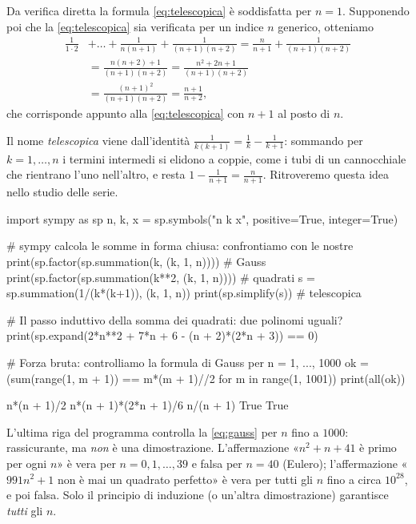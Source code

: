 \begin{dimostrazione}
Da verifica diretta la formula \eqref{eq:telescopica} è soddisfatta per $n=1$.
Supponendo poi che la \eqref{eq:telescopica} sia verificata per un indice $n$ generico,
otteniamo
\begin{equation}\label{eq:telescopica-passo}
\begin{split}
  \frac{1}{1\cdot2}&+\dots+\frac{1}{n(n+1)}+\frac{1}{(n+1)(n+2)}
  =\frac{n}{n+1}+\frac{1}{(n+1)(n+2)}\\
  &=\frac{n(n+2)+1}{(n+1)(n+2)}=\frac{n^{2}+2n+1}{(n+1)(n+2)}\\
  &=\frac{(n+1)^{2}}{(n+1)(n+2)}=\frac{n+1}{n+2},
\end{split}
\end{equation}
che corrisponde appunto alla \eqref{eq:telescopica} con $n+1$ al posto di $n$.
\end{dimostrazione}

\begin{osservazione}
Il nome \emph{telescopica} viene dall'identità $\frac{1}{k(k+1)}=\frac1k-\frac{1}{k+1}$:
sommando per $k=1,\dots,n$ i termini intermedi si elidono a coppie, come i tubi di un
cannocchiale che rientrano l'uno nell'altro, e resta $1-\frac{1}{n+1}=\frac{n}{n+1}$.
Ritroveremo questa idea nello studio delle serie.
\end{osservazione}

\begin{python}
import sympy as sp
n, k, x = sp.symbols("n k x", positive=True, integer=True)

# sympy calcola le somme in forma chiusa: confrontiamo con le nostre
print(sp.factor(sp.summation(k, (k, 1, n))))          # Gauss
print(sp.factor(sp.summation(k**2, (k, 1, n))))       # quadrati
s = sp.summation(1/(k*(k+1)), (k, 1, n))
print(sp.simplify(s))                                 # telescopica

# Il passo induttivo della somma dei quadrati: due polinomi uguali?
print(sp.expand(2*n**2 + 7*n + 6 - (n + 2)*(2*n + 3)) == 0)

# Forza bruta: controlliamo la formula di Gauss per n = 1, ..., 1000
ok = (sum(range(1, m + 1)) == m*(m + 1)//2 for m in range(1, 1001))
print(all(ok))
\end{python}
\begin{risultato}
n*(n + 1)/2
n*(n + 1)*(2*n + 1)/6
n/(n + 1)
True
True
\end{risultato}

\begin{attenzione}
L'ultima riga del programma controlla la \eqref{eq:gauss} per $n$ fino a $1000$:
rassicurante, ma \emph{non} è una dimostrazione. L'affermazione «$n^{2}+n+41$ è primo
per ogni $n$» è vera per $n=0,1,\dots,39$ e falsa per $n=40$ (Eulero); l'affermazione
«$991n^{2}+1$ non è mai un quadrato perfetto» è vera per tutti gli $n$ fino a circa
$10^{28}$, e poi falsa. Solo il principio di induzione (o un'altra dimostrazione)
garantisce \emph{tutti} gli $n$.
\end{attenzione}

